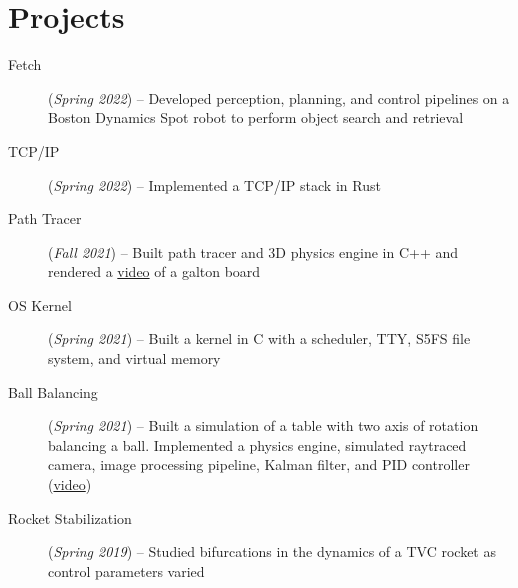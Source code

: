 \documentclass[letterpaper,11pt]{article}
\makeatletter
\newcommand{\resumeItem}[2]{
  \item\small{
    \textbf{#1}{#2 \vspace{-5pt}}
  }
}
\newcommand{\resumeSubheadingSimple}[2]{
  \vspace{-1pt}\item
    \begin{tabular*}{0.97\textwidth}{l@{\extracolsep{\fill}}r}
      \textbf{#1} & \textit{\small#2}\\
    \end{tabular*}\vspace{-3pt}
}
\newcommand{\resumeItemListStart}{\begin{itemize}}
\newcommand{\resumeItemListEnd}{\end{itemize}}
\makeatother
\begin{document}
\section{Projects}
\vspace{3pt}
\small{
\begin{description}
  \item[Fetch] (\textit{Spring 2022}) -- Developed perception, planning, and control pipelines on a Boston Dynamics Spot robot to perform object search and retrieval
  \item[TCP/IP] (\textit{Spring 2022}) -- Implemented a TCP/IP stack in Rust
  \item[Path Tracer] (\textit{Fall 2021}) -- Built path tracer and 3D physics engine in C++ and rendered a \href{https://youtu.be/wIA1xijYGs0}{video} of a galton board
  \item[OS Kernel] (\textit{Spring 2021}) -- Built a kernel in C with a scheduler, TTY, S5FS file system, and virtual memory
  \item[Ball Balancing] (\textit{Spring 2021}) -- Built a simulation of a table with two axis of rotation balancing a ball. Implemented a physics engine, simulated raytraced camera, image processing pipeline, Kalman filter, and PID controller (\href{https://youtu.be/TIc4otyw-zQ}{video})
  \item[Rocket Stabilization] (\textit{Spring 2019}) -- Studied bifurcations in the dynamics of a TVC rocket as control parameters varied

\end{description}
}
\end{document}
